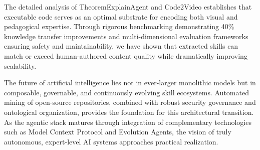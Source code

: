 \documentclass[11pt,a4paper]{article}
\begin{document}
The detailed analysis of TheoremExplainAgent and Code2Video establishes that executable code serves as an optimal substrate for encoding both visual and pedagogical expertise. Through rigorous benchmarking demonstrating 40\% knowledge transfer improvements and multi-dimensional evaluation frameworks ensuring safety and maintainability, we have shown that extracted skills can match or exceed human-authored content quality while dramatically improving scalability.

The future of artificial intelligence lies not in ever-larger monolithic models but in composable, governable, and continuously evolving skill ecosystems. Automated mining of open-source repositories, combined with robust security governance and ontological organization, provides the foundation for this architectural transition. As the agentic stack matures through integration of complementary technologies such as Model Context Protocol and Evolution Agents, the vision of truly autonomous, expert-level AI systems approaches practical realization.
\end{document}
